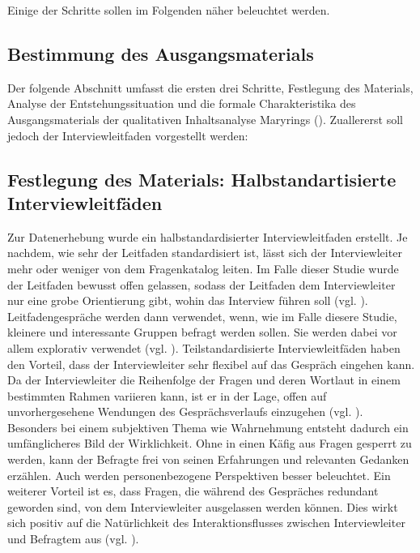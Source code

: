 \documentclass[12pt]{article}
\begin{document}
Einige der Schritte sollen im Folgenden näher beleuchtet werden.

\subsection{Bestimmung des Ausgangsmaterials}

Der folgende Abschnitt umfasst die ersten drei Schritte, \glqq Festlegung des Materials\grqq{}, \glqq Analyse der Entstehungssituation\grqq{} und die \glqq formale Charakteristika des Ausgangsmaterials\grqq{} der qualitativen Inhaltsanalyse Maryrings (\cite[47]{mayring2010qualitative}). Zuallererst soll jedoch der Interviewleitfaden vorgestellt werden:

\subsection*{Festlegung des Materials: Halbstandartisierte Interviewleitfäden}

Zur Datenerhebung wurde ein halbstandardisierter Interviewleitfaden erstellt. Je nachdem, wie sehr der Leitfaden standardisiert ist, lässt sich der Interviewleiter mehr oder weniger von dem Fragenkatalog leiten. Im Falle dieser Studie wurde der Leitfaden bewusst offen gelassen, sodass der Leitfaden dem Interviewleiter nur eine grobe Orientierung gibt, wohin das Interview führen soll (vgl. \cite[113]{flick1995qualitative}).
Leitfadengespräche werden dann verwendet, wenn, wie im Falle diesere Studie, kleinere und interessante Gruppen befragt werden sollen. Sie werden dabei vor allem explorativ verwendet (vgl. \cite[184]{winfried1999empirische}). Teilstandardisierte Interviewleitfäden haben den Vorteil, dass der Interviewleiter sehr flexibel auf das Gespräch eingehen kann. Da der Interviewleiter die Reihenfolge der Fragen und deren Wortlaut in einem bestimmten Rahmen variieren kann, ist er in der Lage, offen auf unvorhergesehene Wendungen des Gesprächsverlaufs einzugehen (vgl. \cite[113]{flick1995qualitative}). Besonders bei einem subjektiven Thema wie Wahrnehmung entsteht dadurch ein umfänglicheres Bild der Wirklichkeit. Ohne in einen Käfig aus Fragen gesperrt zu werden, kann der Befragte frei von seinen Erfahrungen und relevanten Gedanken erzählen. Auch werden personenbezogene Perspektiven besser beleuchtet. Ein weiterer Vorteil ist es, dass Fragen, die während des Gespräches redundant geworden sind, von dem Interviewleiter ausgelassen werden können. Dies wirkt sich positiv auf die Natürlichkeit des Interaktionsflusses zwischen Interviewleiter und Befragtem aus (vgl. \cite[391]{schnell1999methoden}).
\end{document}
